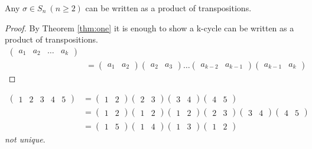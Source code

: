 \begin{proposition}
Any \(\sigma \in S_n \ (n \geq 2)\) can be written as a product of transpositions.
\end{proposition}

\begin{proof}
By Theorem \ref{thm:one} it is enough to show a k-cycle can be written as a product of transpositions.
\begin{align*}
    \begin{pmatrix}a_1 & a_2 & \ldots & a_k \end{pmatrix} \\
    &= \begin{pmatrix}a_1 & a_2\end{pmatrix} \begin{pmatrix}a_2 & a_3\end{pmatrix} \ldots \begin{pmatrix}a_{k-2} & a_{k-1}\end{pmatrix} \begin{pmatrix}a_{k-1} & a_k\end{pmatrix}
\end{align*}
\end{proof}

\begin{example}
\begin{align*}
    \begin{pmatrix}1 & 2 & 3 & 4 & 5\end{pmatrix} &= \begin{pmatrix}1 & 2\end{pmatrix} \begin{pmatrix}2 & 3\end{pmatrix} \begin{pmatrix}3 & 4\end{pmatrix} \begin{pmatrix}4 & 5\end{pmatrix} \\
    &= \begin{pmatrix}1 & 2\end{pmatrix} \begin{pmatrix}1 & 2\end{pmatrix} \begin{pmatrix}1 & 2\end{pmatrix} \begin{pmatrix}2 & 3\end{pmatrix} \begin{pmatrix}3 & 4\end{pmatrix} \begin{pmatrix}4 & 5\end{pmatrix} \\
    &= \begin{pmatrix}1 & 5\end{pmatrix} \begin{pmatrix}1 & 4\end{pmatrix} \begin{pmatrix}1 & 3\end{pmatrix} \begin{pmatrix}1 & 2\end{pmatrix}
\end{align*}
\emph{not unique}.
\end{example}

